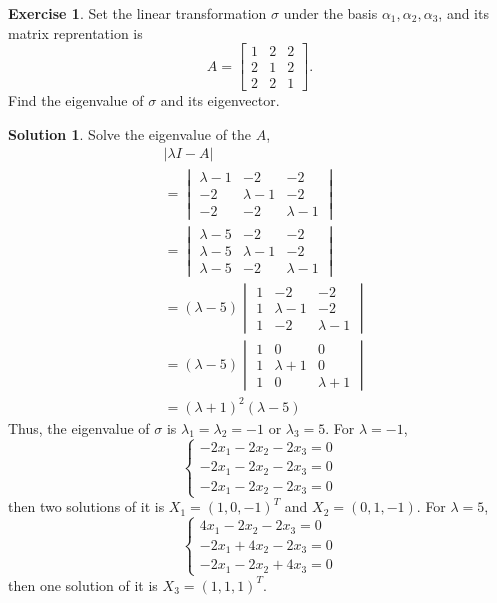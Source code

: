 \documentclass{article}
\theoremstyle{definition}
\newtheorem{exe}{Exercise}[section]
\newtheorem{sol}{Solution}[exe]
\begin{document}
\begin{exe}
    Set the linear transformation $\sigma$ under the basis 
    $\alpha_{1},\alpha_{2},\alpha_{3}$, and its matrix reprentation is 
    $$A=
    \begin{bmatrix} 
        1&2&2\\
        2&1&2\\
        2&2&1
    \end{bmatrix}.$$
    Find the eigenvalue of $\sigma$ and its eigenvector.
\end{exe}

\begin{sol}
    Solve the eigenvalue of the $A$,
    \begin{align*}
    &|\lambda I-A|\\
    &=
    \begin{vmatrix}
        \lambda-1&-2&-2\\
        -2&\lambda-1&-2\\
        -2&-2&\lambda-1
    \end{vmatrix}\\
    &=
    \begin{vmatrix}
        \lambda-5&-2&-2\\
        \lambda-5&\lambda-1&-2\\
        \lambda-5&-2&\lambda-1
    \end{vmatrix}\\
    &=(\lambda-5)
    \begin{vmatrix}
        1&-2&-2\\
        1&\lambda-1&-2\\
        1&-2&\lambda-1
    \end{vmatrix}\\
    &=(\lambda-5)
    \begin{vmatrix}
        1&0&0\\
        1&\lambda+1&0\\
        1&0&\lambda+1
    \end{vmatrix}\\
    &=(\lambda+1)^{2}(\lambda-5)
    \end{align*}
    Thus, the eigenvalue of $\sigma$ is $\lambda_{1}=\lambda_{2}=-1$ or $\lambda_{3}=5$.
    For $\lambda=-1$,
    $$
    \begin{cases}
        -2x_{1}-2x_{2}-2x_{3}=0\\
        -2x_{1}-2x_{2}-2x_{3}=0\\
        -2x_{1}-2x_{2}-2x_{3}=0
    \end{cases}
    $$
    then two solutions of it is $X_{1}=(1,0,-1)^{T}$ and 
    $X_{2}=(0,1,-1)$.
    For $\lambda=5$,
    $$
    \begin{cases}
        4x_{1}-2x_{2}-2x_{3}=0\\
        -2x_{1}+4x_{2}-2x_{3}=0\\
        -2x_{1}-2x_{2}+4x_{3}=0
    \end{cases}
    $$
    then one solution of it is $X_{3}=(1,1,1)^{T}$.


\end{sol}
\end{document}
